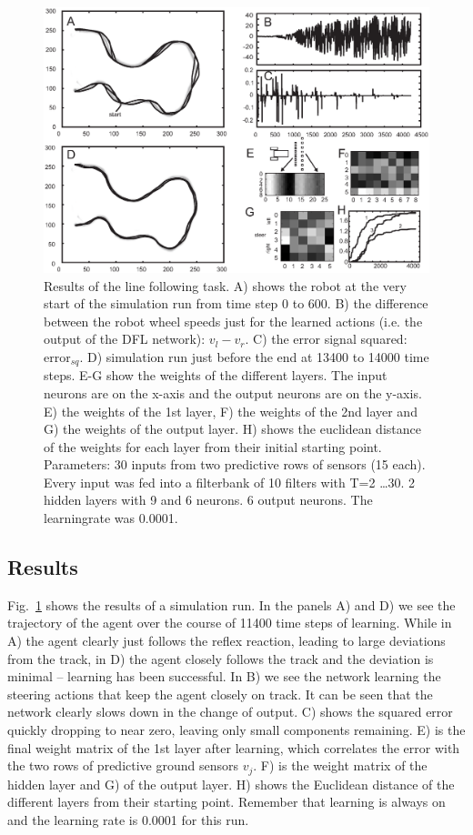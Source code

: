 \documentclass{llncs}
\begin{document}
\begin{figure}[h!]
  \centering
  \includegraphics[width=\columnwidth]{line_results}
  \caption{Results of the line following task. A) shows the robot at
    the very start of the simulation run from time step 0 to 600.
    B) the difference between the robot wheel speeds just for the learned
    actions (i.e. the output of the DFL network): $v_l-v_r$.
    C) the error signal squared: $\mathrm{error}_{sq}$.
    D) simulation run just before the end at 13400 to 14000 time steps.
    E-G show the weights of the different layers. The input neurons are on the x-axis
    and the output neurons are on the y-axis.
    E) the weights of the 1st layer, F) the weights of the 2nd layer and
    G) the weights of the output layer.
        H) shows the euclidean distance of the weights for each layer from their initial starting point. \tiny Parameters: 30 inputs from two predictive rows of sensors (15 each). Every input was fed into a filterbank of 10 filters with T=2 \ldots 30. 2 hidden layers with 9 and 6 neurons. 6 output neurons. The learningrate was 0.0001.
    \label{line_results}}
\end{figure}



\subsection{Results}
Fig.~\ref{line_results} shows the results of a simulation run. In the
panels A) and D) we see the trajectory of the agent over the course of
11400 time steps of learning. While in A) the agent clearly just
follows the reflex reaction, leading to large deviations from the
track, in D) the agent closely follows the track and the deviation is
minimal -- learning has been successful. In B) we see the network
learning the steering actions that keep the agent closely on track.
It can be seen that the network clearly slows down in the change of
output.  C) shows the squared error quickly dropping to near zero,
leaving only small components remaining. E) is the final weight matrix
of the 1st layer after learning, which correlates the error with the
two rows of predictive ground sensors $v_j$. F) is the weight matrix
of the hidden layer and G) of the output layer. H) shows the Euclidean
distance of the different layers from their starting point. Remember
that learning is always on and the learning rate is 0.0001 for this
run.
\end{document}
